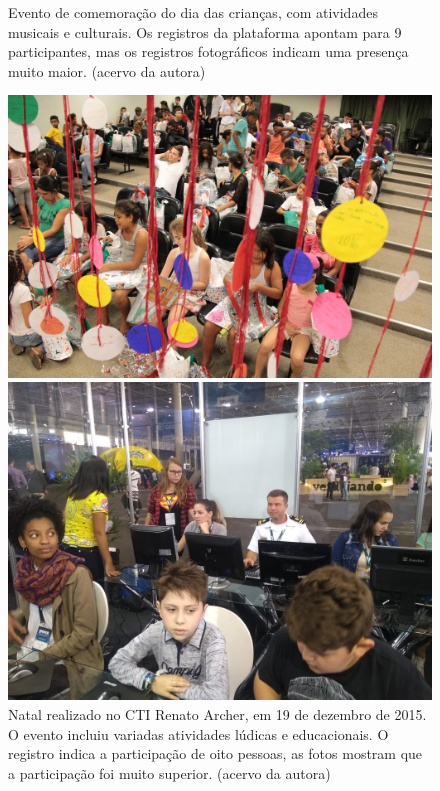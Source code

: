 \begin{figure}[htb]
\begin{minipage}[b]{0.4\linewidth}
                \caption{Evento de comemoração do dia das crianças, com atividades musicais e culturais. Os registros da plataforma apontam para 9 participantes, mas os registros fotográficos indicam uma presença muito maior. (acervo da autora)}
                \label{31e991b69f3aba382518bb571a4e69a720fa8ccb}
\end{minipage}
\hspace{0.5cm}
\begin{minipage}[b]{0.4\linewidth}
        \centering
                \includegraphics[width=1.0\linewidth]{../../../imagens/confraternizacao-de-natal-menor.jpeg}
                \caption{Natal realizado no CTI Renato Archer, em 19 de dezembro de 2015. O evento incluiu variadas atividades lúdicas e educacionais. O registro indica a participação de oito pessoas, as fotos mostram que a participação foi muito superior. (acervo da autora)}
                \label{afa1b2acd7f4c590f25d9821e48e82568bd28cf2}
\end{minipage}%
\hspace{0.5cm}
\begin{minipage}[b]{0.4\linewidth}
        \centering
                \includegraphics[width=1.0\linewidth]{../../../imagens/Evento-Greenk-2018-05-27.jpg}

\end{minipage}
\end{figure}
